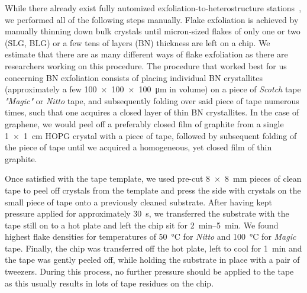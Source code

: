 While there already exist fully automized exfoliation-to-heterostructure stations~\cite{masubuchiAutonomousRoboticSearching2018a}, we performed all of the following steps manually.
%
Flake exfoliation is achieved by manually thinning down bulk crystals until micron-sized flakes of only one or two (SLG, BLG) or a few tens of layers (BN) thickness are left on a chip.
% 
We estimate that there are as many different ways of flake exfoliation as there are researchers working on this procedure.
% 
The procedure that worked best for us concerning BN exfoliation consists of placing individual BN crystallites (approximately a few \SI{100x100x100}{\micro\meter} in volume) on a piece of \textit{Scotch} tape \textit{"Magic"} or \textit{Nitto} tape, and subsequently folding over said piece of tape numerous times, such that one acquires a closed layer of thin BN crystallites.
% 
In the case of graphene, we would peel off a preferably closed film of graphite from a single \SI{1x1}{\centi\meter} HOPG crystal with a piece of tape, followed by subsequent folding of the piece of tape until we acquired a homogeneous, yet closed film of thin graphite.


Once satisfied with the tape template, we used pre-cut \SI{8x8}{\milli\meter} pieces of clean tape to peel off crystals from the template and press the side with crystals on the small piece of tape onto a previously cleaned substrate.
%
After having kept pressure applied for approximately \SI{30}{\second}, we transferred the substrate with the tape still on to a hot plate and left the chip sit for \SIrange{2}{5}{\minute}.
% 
We found highest flake densities for temperatures of \SI{50}{\celsius} for \textit{Nitto} and \SI{100}{\celsius} for \textit{Magic} tape.
% 
Finally, the chip was transferred off the hot plate, left to cool for \SI{1}{\minute} and the tape was gently peeled off, while holding the substrate in place with a pair of tweezers.
% 
During this process, no further pressure should be applied to the tape as this usually results in lots of tape residues on the chip.


